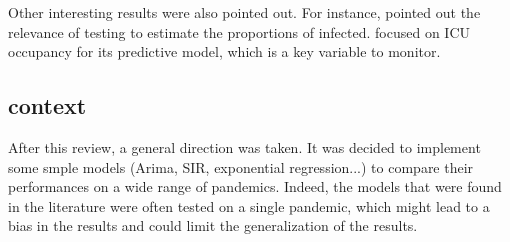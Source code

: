 Other interesting results were also pointed out. 
For instance, \cite{hult2020estimates} pointed out the relevance of testing to estimate the proportions of infected. 
\cite{sjodin2020covid} focused on ICU occupancy for its predictive model, which is a key variable to monitor. 

\subsection{context}

After this review, a general direction was taken. 
It was decided to implement some smple models (Arima, SIR, exponential regression...) to compare their performances on a wide range of pandemics. 
Indeed, the models that were found in the literature were often tested on a single pandemic, which might lead to a bias in the results and could limit the generalization of the results.
